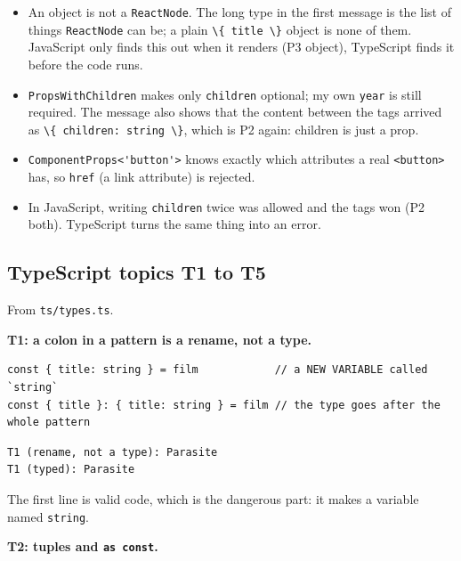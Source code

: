 \documentclass[
]{article}
\newcommand{\passthrough}[1]{#1}
\providecommand{\tightlist}{%
  \setlength{\itemsep}{0pt}\setlength{\parskip}{0pt}}
\begin{document}
\begin{itemize}
\tightlist
\item
  An object is not a \passthrough{\lstinline!ReactNode!}. The long type
  in the first message is the list of things
  \passthrough{\lstinline!ReactNode!} can be; a plain
  \passthrough{\lstinline!\{ title \}!} object is none of them.
  JavaScript only finds this out when it renders (P3 object), TypeScript
  finds it before the code runs.
\item
  \passthrough{\lstinline!PropsWithChildren!} makes only
  \passthrough{\lstinline!children!} optional; my own
  \passthrough{\lstinline!year!} is still required. The message also
  shows that the content between the tags arrived as
  \passthrough{\lstinline!\{ children: string \}!}, which is P2 again:
  children is just a prop.
\item
  \passthrough{\lstinline!ComponentProps<'button'>!} knows exactly which
  attributes a real \passthrough{\lstinline!<button>!} has, so
  \passthrough{\lstinline!href!} (a link attribute) is rejected.
\item
  In JavaScript, writing \passthrough{\lstinline!children!} twice was
  allowed and the tags won (P2 both). TypeScript turns the same thing
  into an error.
\end{itemize}

\hypertarget{typescript-topics-t1-to-t5}{%
\subsection{TypeScript topics T1 to
T5}\label{typescript-topics-t1-to-t5}}

From \passthrough{\lstinline!ts/types.ts!}.

\textbf{T1: a colon in a pattern is a rename, not a type.}

\begin{lstlisting}
const { title: string } = film            // a NEW VARIABLE called `string`
const { title }: { title: string } = film // the type goes after the whole pattern
\end{lstlisting}

\begin{lstlisting}
T1 (rename, not a type): Parasite
T1 (typed): Parasite
\end{lstlisting}

The first line is valid code, which is the dangerous part: it makes a
variable named \passthrough{\lstinline!string!}.

\textbf{T2: tuples and \passthrough{\lstinline!as const!}.}
\end{document}
